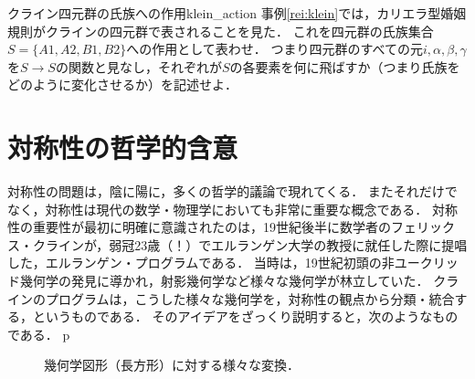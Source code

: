 \documentclass[11pt,a4paper]{jsarticle}
\begin{document}
\begin{renshu}{クライン四元群の氏族への作用}{klein_action}
    事例\ref{rei:klein}では，カリエラ型婚姻規則がクラインの四元群で表されることを見た．
    これを四元群の氏族集合$S = \{A1, A2, B1, B2\}$への作用として表わせ．
    つまり四元群のすべての元$i, \alpha, \beta, \gamma$を$S \to S$の関数と見なし，それぞれが$S$の各要素を何に飛ばすか（つまり氏族をどのように変化させるか）を記述せよ．
\end{renshu}

\section{対称性の哲学的含意}

対称性の問題は，陰に陽に，多くの哲学的議論で現れてくる．
またそれだけでなく，対称性は現代の数学・物理学においても非常に重要な概念である．
対称性の重要性が最初に明確に意識されたのは，19世紀後半に数学者のフェリックス・クラインが，弱冠23歳（！）でエルランゲン大学の教授に就任した際に提唱した，エルランゲン・プログラムである．
当時は，19世紀初頭の非ユークリッド幾何学の発見に導かれ，射影幾何学など様々な幾何学が林立していた．
クラインのプログラムは，こうした様々な幾何学を，対称性の観点から分類・統合する，というものである．
そのアイデアをざっくり説明すると，次のようなものである．
p\begin{figure}[h]
\begin{center}
\hspace{2em}
\hspace{2em}
\hspace{2em}
\hspace{2em}
\end{center}
\caption{幾何学図形（長方形）に対する様々な変換．}
\label{erlangen}
\end{figure}
\end{document}

